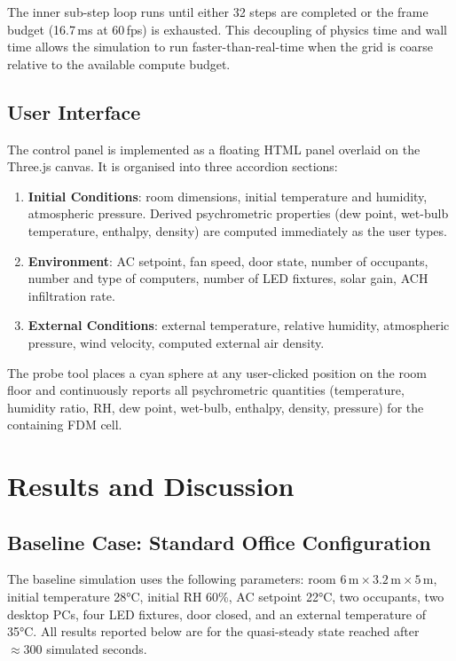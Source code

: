 \documentclass[12pt,a4paper]{report}
\begin{document}
The inner sub-step loop runs until either 32 steps are completed or the frame budget (16.7\,ms at 60\,fps) is exhausted. This decoupling of physics time and wall time allows the simulation to run faster-than-real-time when the grid is coarse relative to the available compute budget.

\section{User Interface}
\label{sec:ui}

The control panel is implemented as a floating HTML panel overlaid on the Three.js canvas. It is organised into three accordion sections:

\begin{enumerate}
  \item \textbf{Initial Conditions}: room dimensions, initial temperature and humidity, atmospheric pressure. Derived psychrometric properties (dew point, wet-bulb temperature, enthalpy, density) are computed immediately as the user types.
  \item \textbf{Environment}: AC setpoint, fan speed, door state, number of occupants, number and type of computers, number of LED fixtures, solar gain, ACH infiltration rate.
  \item \textbf{External Conditions}: external temperature, relative humidity, atmospheric pressure, wind velocity, computed external air density.
\end{enumerate}

The probe tool places a cyan sphere at any user-clicked position on the room floor and continuously reports all psychrometric quantities (temperature, humidity ratio, RH, dew point, wet-bulb, enthalpy, density, pressure) for the containing FDM cell.

\chapter{Results and Discussion}
\label{ch:results}

\section{Baseline Case: Standard Office Configuration}
\label{sec:baseline}

The baseline simulation uses the following parameters: room $6\,\text{m}\times3.2\,\text{m}\times5\,\text{m}$, initial temperature 28°C, initial RH 60\%, AC setpoint 22°C, two occupants, two desktop PCs, four LED fixtures, door closed, and an external temperature of 35°C. All results reported below are for the quasi-steady state reached after $\approx 300$ simulated seconds.
\end{document}
